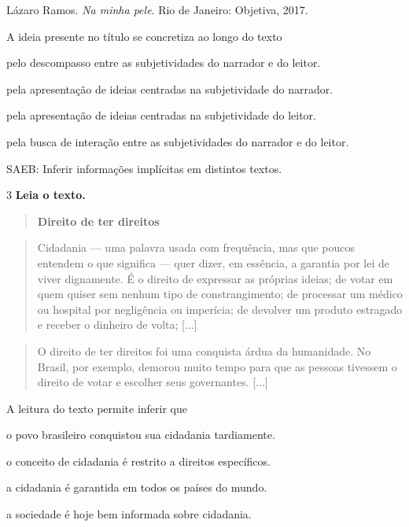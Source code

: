 Lázaro Ramos. \emph{Na minha pele}. Rio de Janeiro: Objetiva, 2017.

A ideia presente no título se concretiza ao longo do texto

\begin{escolha}
\item pelo descompasso entre as subjetividades do narrador e do leitor.

\item pela apresentação de ideias centradas na subjetividade do narrador.

\item pela apresentação de ideias centradas na subjetividade do leitor.

\item pela busca de interação entre as subjetividades do narrador e do
leitor.
\end{escolha}

SAEB: Inferir informações implícitas em distintos textos.

\num{3} \textbf{Leia o texto.}

\begin{quote}
\textbf{Direito de ter direitos}
\end{quote}

\begin{quote}
Cidadania --- uma palavra usada com frequência, mas que poucos entendem
o que significa --- quer dizer, em essência, a garantia por lei de viver
dignamente. É o direito de expressar as próprias ideias; de votar em
quem quiser sem nenhum tipo de constrangimento; de processar um médico
ou hospital por negligência ou imperícia; de devolver um produto
estragado e receber o dinheiro de volta; {[}...{]}
\end{quote}

\begin{quote}
O direito de ter direitos foi uma conquista árdua da humanidade. No
Brasil, por exemplo, demorou muito tempo para que as pessoas tivessem o
direito de votar e escolher seus governantes. {[}...{]}
\end{quote}


A leitura do texto permite inferir que

\begin{escolha}
\item o povo brasileiro conquistou sua cidadania tardiamente.

\item o conceito de cidadania é restrito a direitos específicos.

\item a cidadania é garantida em todos os países do mundo.

\item a sociedade é hoje bem informada sobre cidadania.
\end{escolha}

